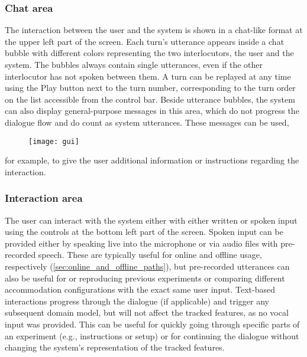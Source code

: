 \subsubsection{Chat area}
\label{subsubsec:chat_area}

The interaction between the user and the system is shown in a chat-like format at the upper left part of the screen.
Each turn's utterance appears inside a chat bubble with different colors representing the two interlocutors, the user and the system.
The bubbles always contain single utterances, even if the other interlocutor has not spoken between them.
A turn can be replayed at any time using the Play button next to the turn number, corresponding to the turn order on the list accessible from the control bar.
Beside utterance bubbles, the system can also display general-purpose messages in this area, which do not progress the dialogue flow and do count as system utterances.
These messages can be used,
%
\begin{landscape}
	\begin{figure}[t]
		\centering
		\vspace*{-2cm}
		\hspace*{-2cm}
		\texttt{[image: gui]}
		\caption[Web system in-browser \acs{gui}]
			{}
		\label{fig:gui}
	\end{figure}
\end{landscape}
\noindent
for example, to give the user additional information or instructions regarding the interaction.

\subsubsection{Interaction area}
\label{subsubsec:interaction_area}

The user can interact with the system either with either written or spoken input using the controls at the bottom left part of the screen.
Spoken input can be provided either by speaking live into the microphone or via audio files with pre-recorded speech.
These are typically useful for online and offline usage, respectively (\cref{sec:online_and_offline_paths}), but pre-recorded utterances can also be useful for or reproducing previous experiments or comparing different accommodation configurations with the exact same user input.
Text-based interactions progress through the dialogue (if applicable) and trigger any subsequent domain model, but will not affect the tracked features, as no vocal input was provided.
This can be useful for quickly going through specific parts of an experiment (e.g., instructions or setup) or for continuing the dialogue without changing the system's representation of the tracked features.

